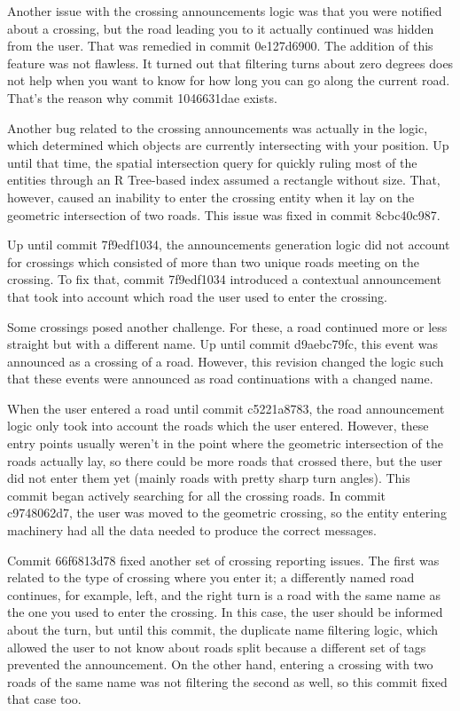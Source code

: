 \documentclass[nolof,digital]{fithesis3}
\begin{document}
Another issue with the crossing announcements logic was that you were notified about a crossing, but the road leading you to it actually continued was hidden from the user. That was remedied in commit 0e127d6900. The addition of this feature was not flawless. It turned out that filtering turns about zero degrees does not help when you want to know for how long you can go along the current road. That's the reason why commit 1046631dae exists.

Another bug related to the crossing announcements was actually in the logic, which determined which objects are currently intersecting with your position. Up until that time, the spatial intersection query for quickly ruling most of the entities through an R Tree-based index assumed a rectangle without size. That, however, caused an inability to enter the crossing entity when it lay on the geometric intersection of two roads. This issue was fixed in commit 8cbc40c987.

Up until commit 7f9edf1034, the announcements generation logic did not account for crossings which consisted of more than two unique roads meeting on the crossing. To fix that, commit 7f9edf1034 introduced a contextual announcement that took into account which road the user used to enter the crossing.

Some crossings posed another challenge. For these, a road continued more or less straight but with a different name. Up until commit d9aebc79fc, this event was announced as a crossing of a road. However, this revision changed the logic such that these events were announced as road continuations with a changed name.

When the user entered a road until commit c5221a8783, the road announcement logic only took into account the roads which the user entered. However, these entry points usually weren't in the point where the geometric intersection of the roads actually lay, so there could be more roads that crossed there, but the user did not enter them yet (mainly roads with pretty sharp turn angles). This commit began actively searching for all the crossing roads. In commit c9748062d7, the user was moved to the geometric crossing, so the entity entering machinery had all the data needed to produce the correct messages.

Commit 66f6813d78 fixed another set of crossing reporting issues. The first was related to the type of crossing where you enter it; a differently named road continues, for example, left, and the right turn is a road with the same name as the one you used to enter the crossing. In this case, the user should be informed about the turn, but until this commit, the duplicate name filtering logic, which allowed the user to not know about roads split because a different set of tags prevented the announcement. On the other hand, entering a crossing with two roads of the same name was not filtering the second as well, so this commit fixed that case too.
\end{document}
